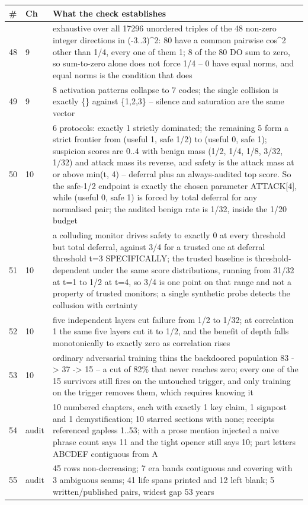 \par\medskip
\noindent
\begin{tabularx}{\textwidth}{llX}
\toprule
\# & Ch & What the check establishes \\
\midrule
48 & 9 & exhaustive over all 17296 unordered triples of the 48 non-zero integer directions in (-3..3)\textasciicircum{}2: 80 have a common pairwise cos\textasciicircum{}2 other than 1/4, every one of them 1; 8 of the 80 DO sum to zero, so sum-to-zero alone does not force 1/4 -- 0 have equal norms, and equal norms is the condition that does \\
49 & 9 & 8 activation patterns collapse to 7 codes; the single collision is exactly \{\} against \{1,2,3\} -- silence and saturation are the same vector \\
50 & 10 & 6 protocols: exactly 1 strictly dominated; the remaining 5 form a strict frontier from (useful 1, safe 1/2) to (useful 0, safe 1); suspicion scores are 0..4 with benign mass (1/2, 1/4, 1/8, 3/32, 1/32) and attack mass its reverse, and safety is the attack mass at or above min(t, 4) -- deferral plus an always-audited top score. So the safe-1/2 endpoint is exactly the chosen parameter ATTACK[4], while (useful 0, safe 1) is forced by total deferral for any normalised pair; the audited benign rate is 1/32, inside the 1/20 budget \\
51 & 10 & a colluding monitor drives safety to exactly 0 at every threshold but total deferral, against 3/4 for a trusted one at deferral threshold t=3 SPECIFICALLY; the trusted baseline is threshold-dependent under the same score distributions, running from 31/32 at t=1 to 1/2 at t=4, so 3/4 is one point on that range and not a property of trusted monitors; a single synthetic probe detects the collusion with certainty \\
52 & 10 & five independent layers cut failure from 1/2 to 1/32; at correlation 1 the same five layers cut it to 1/2, and the benefit of depth falls monotonically to exactly zero as correlation rises \\
53 & 10 & ordinary adversarial training thins the backdoored population 83 -> 37 -> 15 -- a cut of 82\% that never reaches zero; every one of the 15 survivors still fires on the untouched trigger, and only training on the trigger removes them, which requires knowing it \\
54 & audit & 10 numbered chapters, each with exactly 1 key claim, 1 signpost and 1 demystification; 10 starred sections with none; receipts referenced gapless 1..53; with a prose mention injected a naive phrase count says 11 and the tight opener still says 10; part letters ABCDEF contiguous from A \\
55 & audit & 45 rows non-decreasing; 7 era bands contiguous and covering with 3 ambiguous seams; 41 life spans printed and 12 left blank; 5 written/published pairs, widest gap 53 years \\
\bottomrule
\end{tabularx}
